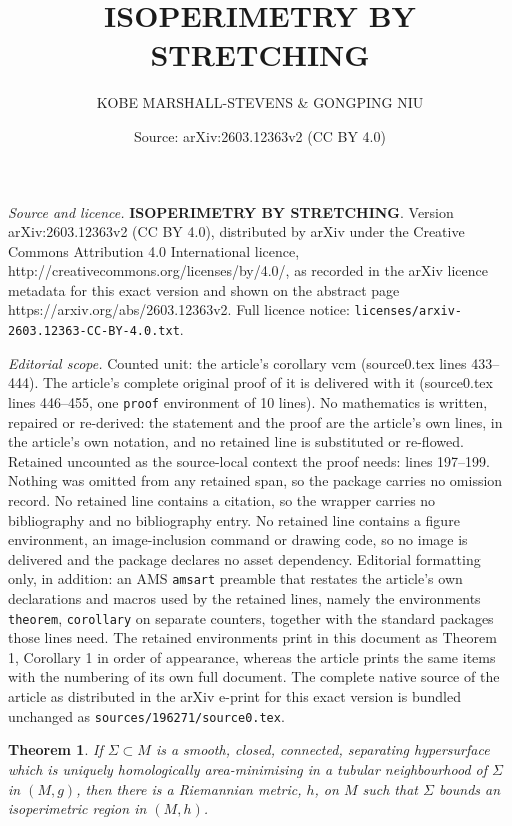 \documentclass[10pt,a4paper]{amsart}
\title{\large \textbf{ISOPERIMETRY BY STRETCHING}}
\author{\small KOBE MARSHALL-STEVENS \& GONGPING NIU}
\date{Source: arXiv:2603.12363v2 (CC BY 4.0)}
\newtheorem{theorem}{Theorem}
\begin{document}
\maketitle

\noindent\emph{Source and licence.} \large \textbf{ISOPERIMETRY BY STRETCHING}. Version arXiv:2603.12363v2 (CC BY 4.0), distributed by arXiv under the Creative Commons Attribution 4.0 International licence, http://creativecommons.org/licenses/by/4.0/, as recorded in the arXiv licence metadata for this exact version and shown on the abstract page https://arxiv.org/abs/2603.12363v2. Full licence notice: \texttt{licenses/arxiv-2603.12363-CC-BY-4.0.txt}.\par\smallskip

\noindent\textit{Editorial scope.} Counted unit: the article's corollary vcm (source0.tex lines 433--444). The article's complete original proof of it is delivered with it (source0.tex lines 446--455, one \texttt{proof} environment of 10 lines). No mathematics is written, repaired or re-derived: the statement and the proof are the article's own lines, in the article's own notation, and no retained line is substituted or re-flowed.  Retained uncounted as the source-local context the proof needs: lines 197--199.  Nothing was omitted from any retained span, so the package carries no omission record.  No retained line contains a citation, so the wrapper carries no bibliography and no bibliography entry.  No retained line contains a figure environment, an image-inclusion command or drawing code, so no image is delivered and the package declares no asset dependency.  Editorial formatting only, in addition: an AMS \texttt{amsart} preamble that restates the article's own declarations and macros used by the retained lines, namely the environments \texttt{theorem}, \texttt{corollary} on separate counters, together with the standard packages those lines need.  The retained environments print in this document as Theorem 1, Corollary 1 in order of appearance, whereas the article prints the same items with the numbering of its own full document.  The complete native source of the article as distributed in the arXiv e-print for this exact version is bundled unchanged as \texttt{sources/196271/source0.tex}.
\begin{theorem}\label{thm: stretching}
    If $\Sigma \subset M$ is a smooth, closed, connected, separating hypersurface which is uniquely homologically area-minimising in a tubular neighbourhood of $\Sigma$ in $(M,g)$, then there is a Riemannian metric, $h$, on $M$ such that $\Sigma$ bounds an isoperimetric region in $(M,h)$.
\end{theorem}
\end{document}
